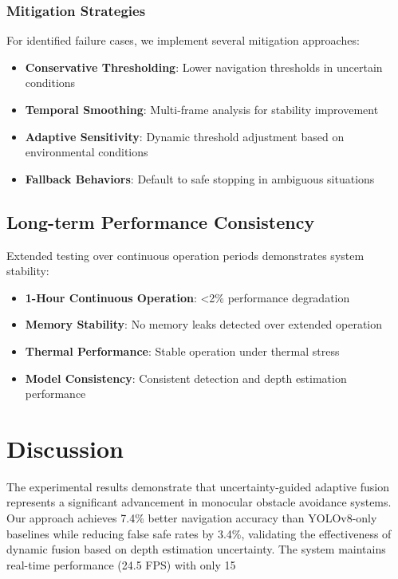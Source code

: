 \documentclass[10pt]{article}
\begin{document}
\subsubsection{Mitigation Strategies}

For identified failure cases, we implement several mitigation approaches:

\begin{itemize}
\item \textbf{Conservative Thresholding}: Lower navigation thresholds in uncertain conditions
\item \textbf{Temporal Smoothing}: Multi-frame analysis for stability improvement
\item \textbf{Adaptive Sensitivity}: Dynamic threshold adjustment based on environmental conditions
\item \textbf{Fallback Behaviors}: Default to safe stopping in ambiguous situations
\end{itemize}

\subsection{Long-term Performance Consistency}

Extended testing over continuous operation periods demonstrates system stability:

\begin{itemize}
\item \textbf{1-Hour Continuous Operation}: <2\% performance degradation
\item \textbf{Memory Stability}: No memory leaks detected over extended operation
\item \textbf{Thermal Performance}: Stable operation under thermal stress
\item \textbf{Model Consistency}: Consistent detection and depth estimation performance
\end{itemize}

\section{Discussion}

The experimental results demonstrate that uncertainty-guided adaptive fusion represents a significant advancement in monocular obstacle avoidance systems. Our approach achieves 7.4\% better navigation accuracy than YOLOv8-only baselines while reducing false safe rates by 3.4\%, validating the effectiveness of dynamic fusion based on depth estimation uncertainty. The system maintains real-time performance (24.5 FPS) with only 15%
\end{document}
